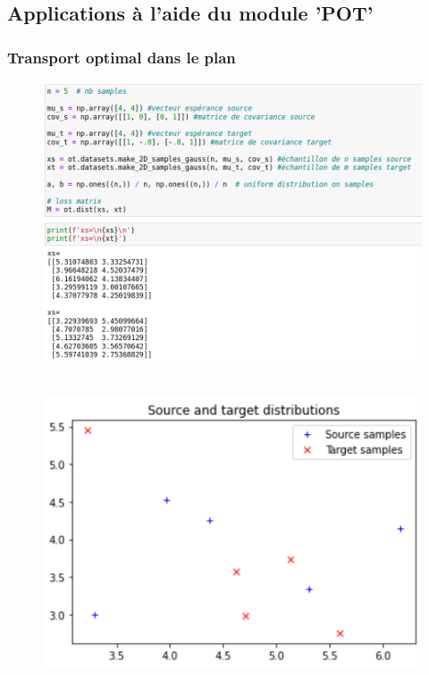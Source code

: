 \documentclass{beamer}
\theoremstyle{definition}
\begin{document}
\begin{frame}
\begin{minipage}[c]{1\linewidth}
\begin{minipage}[c]{0.45\linewidth}
\begin{figure}
		\end{figure}\end{minipage}
	\end{minipage}
\end{frame}
\subsection{Applications à l'aide du module 'POT'}

\begin{frame}
	\frametitle{Transport optimal dans le plan}
		\begin{minipage}[t]{1\linewidth}
		\begin{minipage}{0.4\linewidth}\centering\begin{figure}
				\centering
				\includegraphics[scale= 0.34]{a1.png}
		\end{figure}\end{minipage}\quad \quad 
		\begin{minipage}{0.43\linewidth}\centering\begin{figure}
				\hfill\\[4cm]
				\includegraphics[scale= 0.36]{a2.png}		
		\end{figure}\end{minipage}
	\end{minipage}
\end{frame}
\end{document}
